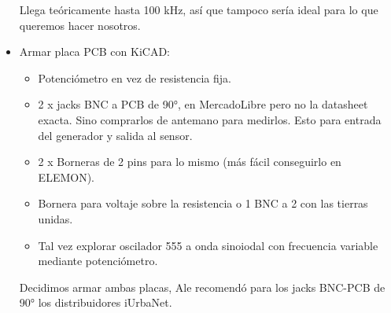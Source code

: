\begin{itemize}
	Llega teóricamente hasta 100 kHz, así que tampoco sería ideal para lo que queremos hacer nosotros.
	
	
	\item Armar placa PCB con KiCAD:
	
	\begin{itemize}
		\item Potenciómetro en vez de resistencia fija.
		\item 2 x jacks BNC a PCB de 90°, en MercadoLibre pero no la datasheet exacta. Sino comprarlos de antemano para medirlos. Esto para entrada del generador y salida al sensor.
		\item 2 x Borneras de 2 pins para lo mismo (más fácil conseguirlo en ELEMON).
		\item Bornera para voltaje sobre la resistencia o 1 BNC a 2 con las tierras unidas.
		\item Tal vez explorar oscilador 555 a onda sinoiodal con frecuencia variable mediante potenciómetro. 
	\end{itemize}
	
	Decidimos armar ambas placas, Ale recomendó para los jacks BNC-PCB de 90° los distribuidores iUrbaNet. %
	
\end{itemize}
